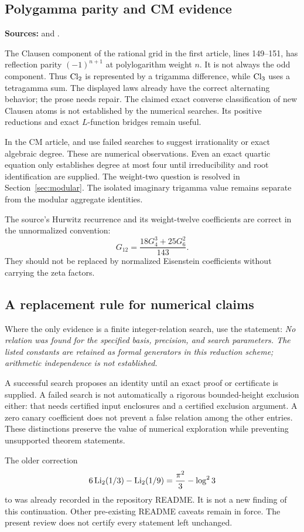 \subsection{Polygamma parity and CM evidence}

\noindent\textbf{Sources:}
 and
.

The Clausen component of the rational grid in the first article,
lines 149--151, has reflection parity \((-1)^{n+1}\) at
polylogarithm weight \(n\). It is not always the odd component.
Thus \(\operatorname{Cl}_2\) is represented by a trigamma difference, while
\(\operatorname{Cl}_3\) uses a tetragamma sum. The displayed laws already have
the correct alternating behavior; the prose needs repair.
The claimed exact converse classification of new Clausen atoms is
not established by the numerical searches. Its positive reductions
and exact \(L\)-function bridges remain useful.

In the CM article,  and  use failed
searches to suggest irrationality or exact algebraic degree.
These are numerical observations. Even an exact quartic equation
only establishes degree at most four until irreducibility and root
identification are supplied.
The weight-two question is resolved in Section~\ref{sec:modular}.
The isolated imaginary trigamma value remains separate from the
modular aggregate identities.

The source's Hurwitz recurrence and its weight-twelve coefficients
are correct in the unnormalized convention:
\[
G_{12}=\frac{18G_4^3+25G_6^2}{143}.
\]
They should not be replaced by normalized Eisenstein coefficients
without carrying the zeta factors.

\subsection{A replacement rule for numerical claims}

Where the only evidence is a finite integer-relation search, use
the statement:
\emph{No relation was found for the specified basis, precision, and
search parameters. The listed constants are retained as formal
generators in this reduction scheme; arithmetic independence is not
established.}

A successful search proposes an identity until an exact proof or
certificate is supplied. A failed search is not automatically a
rigorous bounded-height exclusion either: that needs certified input
enclosures and a certified exclusion argument. A zero canary
coefficient does not prevent a false relation among the other
entries. These distinctions preserve the value of numerical
exploration while preventing unsupported theorem statements.

The older correction
\[
6\operatorname{Li}_2(1/3)-\operatorname{Li}_2(1/9)=\frac{\pi^2}{3}-\log^2 3
\]
to  was already recorded in the
repository README. It is not a new finding of this continuation.
Other pre-existing README caveats remain in force.
The present review does not certify every statement left unchanged.
